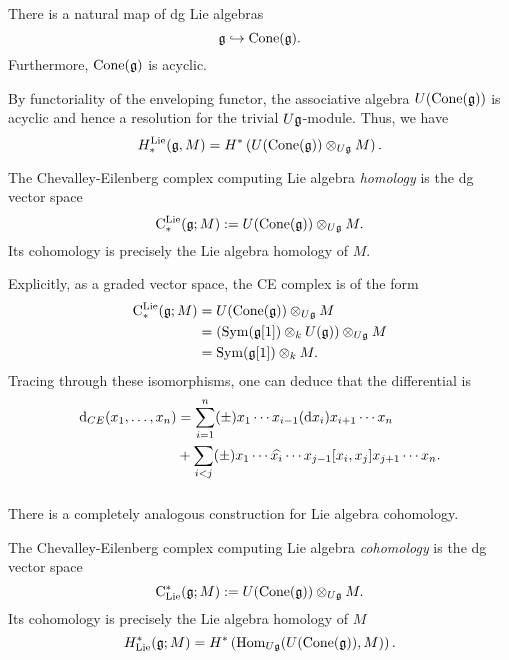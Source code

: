 \documentclass[11pt]{amsart}
\begin{document}
\begin{lem}
There is a natural map of dg Lie algebras
\[
\mathfrak g \hookrightarrow {\rm Cone}(\mathfrak g) .
\]
Furthermore, ${\rm Cone}(\mathfrak g)$ is acyclic.
\end{lem} 

By functoriality of the enveloping functor, the associative algebra $U({\rm Cone}(\mathfrak g))$ is acyclic and hence a resolution for the trivial $U \mathfrak g$-module.
Thus, we have
\[
H^{\rm Lie}_*(\mathfrak g, M) = H^*\left(U({\rm Cone}(\mathfrak g)) \otimes_{U \mathfrak g} M \right) .
\] 

\begin{dfn}
The Chevalley-Eilenberg complex computing Lie algebra {\em homology} is the dg vector space
\[
{\rm C}^{\rm Lie}_*(\mathfrak g ; M) := U({\rm Cone}(\mathfrak g)) \otimes_{U \mathfrak g} M .
\] 
Its cohomology is precisely the Lie algebra homology of $M$.
\end{dfn}

\begin{rmk}
Explicitly, as a graded vector space, the CE complex is of the form
\begin{align*}
{\rm C}^{\rm Lie}_*(\mathfrak g ; M) & = U({\rm Cone}(\mathfrak g)) \otimes_{U \mathfrak g} M  \\ & = \left({\rm Sym}(\mathfrak g[1]) \otimes_k U(\mathfrak g)\right) \otimes_{U \mathfrak g} M \\ &= {\rm Sym}(\mathfrak g[1]) \otimes_k M .
\end{align*}
Tracing through these isomorphisms, one can deduce that the differential is
\begin{align*}
{\rm d}_{CE} (x_1,\ldots, x_n) & = \sum_{i = 1}^n (\pm) x_1 \cdots x_{i-1} ({\rm d} x_i) x_{i+1} \cdots x_n \\ & + \sum_{i < j} (\pm) x_1\cdots \widehat{x_i} \cdots x_{j-1} [x_i,x_j] x_{j+1} \cdots x_n .
\end{align*}
\end{rmk}

\subsubsection{}

There is a completely analogous construction for Lie algebra cohomology. 

\begin{dfn}
The Chevalley-Eilenberg complex computing Lie algebra {\em cohomology} is the dg vector space
\[
{\rm C}_{{\rm Lie}}^*(\mathfrak g ; M) := U({\rm Cone}(\mathfrak g)) \otimes_{U \mathfrak g} M .
\] 
Its cohomology is precisely the Lie algebra homology of $M$
\[
H_{\rm Lie}^*(\mathfrak g ; M) = H^*\left({\rm Hom}_{U \mathfrak g}(U({\rm Cone}(\mathfrak g)), M)\right) .
\]
\end{dfn}
\end{document}
